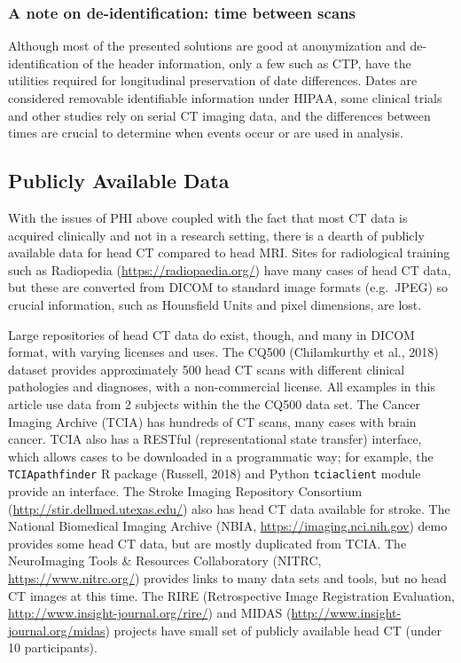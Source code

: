 \documentclass[utf8]{frontiersSCNS}
\begin{document}
\hypertarget{a-note-on-de-identification-time-between-scans}{%
\subsubsection{A note on de-identification: time between scans}\label{a-note-on-de-identification-time-between-scans}}

Although most of the presented solutions are good at anonymization and de-identification of the header information, only a few such as CTP, have the utilities required for longitudinal preservation of date differences. Dates are considered removable identifiable information under HIPAA, some clinical trials and other studies rely on serial CT imaging data, and the differences between times are crucial to determine when events occur or are used in analysis.

\hypertarget{publicly-available-data}{%
\subsection{Publicly Available Data}\label{publicly-available-data}}

With the issues of PHI above coupled with the fact that most CT data is acquired clinically and not in a research setting, there is a dearth of publicly available data for head CT compared to head MRI. Sites for radiological training such as Radiopedia (\url{https://radiopaedia.org/}) have many cases of head CT data, but these are converted from DICOM to standard image formats (e.g.~JPEG) so crucial information, such as Hounsfield Units and pixel dimensions, are lost.

Large repositories of head CT data do exist, though, and many in DICOM format, with varying licenses and uses. The CQ500 (Chilamkurthy et al., 2018) dataset provides approximately 500 head CT scans with different clinical pathologies and diagnoses, with a non-commercial license. All examples in this article use data from 2 subjects within the the CQ500 data set. The Cancer Imaging Archive (TCIA) has hundreds of CT scans, many cases with brain cancer. TCIA also has a RESTful (representational state transfer) interface, which allows cases to be downloaded in a programmatic way; for example, the \texttt{TCIApathfinder} R package (Russell, 2018) and Python \texttt{tciaclient} module provide an interface. The Stroke Imaging Repository Consortium (\url{http://stir.dellmed.utexas.edu/}) also has head CT data available for stroke. The National Biomedical Imaging Archive (NBIA, \url{https://imaging.nci.nih.gov}) demo provides some head CT data, but are mostly duplicated from TCIA. The NeuroImaging Tools \& Resources Collaboratory (NITRC, \url{https://www.nitrc.org/}) provides links to many data sets and tools, but no head CT images at this time. The RIRE (Retrospective Image Registration Evaluation, \url{http://www.insight-journal.org/rire/}) and MIDAS (\url{http://www.insight-journal.org/midas}) projects have small set of publicly available head CT (under 10 participants).
\end{document}
